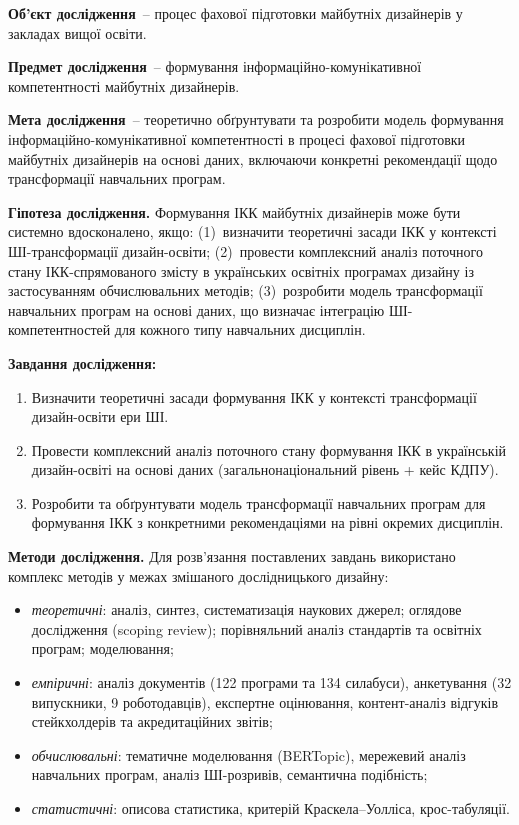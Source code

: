 \textbf{Об'єкт дослідження}~-- процес фахової підготовки майбутніх дизайнерів у закладах вищої освіти.

\textbf{Предмет дослідження}~-- формування інформаційно-комунікативної компетентності майбутніх дизайнерів.

\textbf{Мета дослідження}~-- теоретично обґрунтувати та розробити модель формування інформаційно-комунікативної компетентності в процесі фахової підготовки майбутніх дизайнерів на основі даних, включаючи конкретні рекомендації щодо трансформації навчальних програм.

\textbf{Гіпотеза дослідження.} Формування ІКК майбутніх дизайнерів може бути системно вдосконалено, якщо: (1)~визначити теоретичні засади ІКК у контексті ШІ-трансформації дизайн-освіти; (2)~провести комплексний аналіз поточного стану ІКК-спрямованого змісту в українських освітніх програмах дизайну із застосуванням обчислювальних методів; (3)~розробити модель трансформації навчальних програм на основі даних, що визначає інтеграцію ШІ-компетентностей для кожного типу навчальних дисциплін.

\textbf{Завдання дослідження:}
\begin{enumerate}
    \item Визначити теоретичні засади формування ІКК у контексті трансформації дизайн-освіти ери ШІ.
    \item Провести комплексний аналіз поточного стану формування ІКК в українській дизайн-освіті на основі даних (загальнонаціональний рівень + кейс КДПУ).
    \item Розробити та обґрунтувати модель трансформації навчальних програм для формування ІКК з конкретними рекомендаціями на рівні окремих дисциплін.
\end{enumerate}

\textbf{Методи дослідження.} Для розв'язання поставлених завдань використано комплекс методів у межах змішаного дослідницького дизайну:
\begin{itemize}
    \item \textit{теоретичні}: аналіз, синтез, систематизація наукових джерел; оглядове дослідження (scoping review); порівняльний аналіз стандартів та освітніх програм; моделювання;
    \item \textit{емпіричні}: аналіз документів (122 програми та 134 силабуси), анкетування (32 випускники, 9 роботодавців), експертне оцінювання, контент-аналіз відгуків стейкхолдерів та акредитаційних звітів;
    \item \textit{обчислювальні}: тематичне моделювання (BERTopic), мережевий аналіз навчальних програм, аналіз ШІ-розривів, семантична подібність;
    \item \textit{статистичні}: описова статистика, критерій Краскела--Уолліса, крос-табуляції.
\end{itemize}

